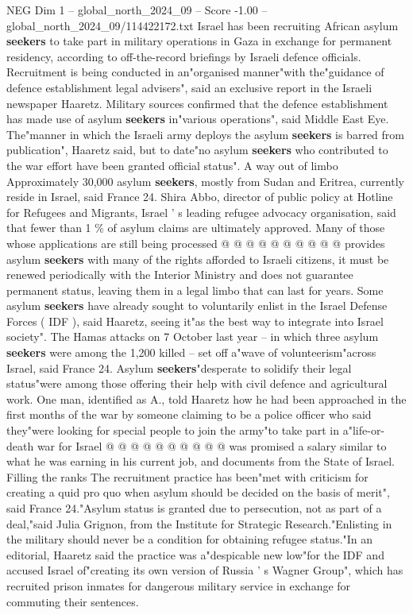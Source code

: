 \begin{textsample}{NEG Dim 1 – global\_north\_2024\_09 – Score -1.00 – global\_north\_2024\_09/114422172.txt}  \label{ex:f1_neg_359}
Israel has been recruiting African asylum \textbf{seekers} to take part in military operations in Gaza in exchange for permanent residency, according to off-the-record briefings by Israeli defence officials.
Recruitment is being conducted in an"organised manner"with the"guidance of defence establishment legal advisers", said an exclusive report in the Israeli newspaper Haaretz.
Military sources confirmed that the defence establishment has made use of asylum \textbf{seekers} in"various operations", said Middle East Eye.
The"manner in which the Israeli army deploys the asylum \textbf{seekers} is barred from publication", Haaretz said, but to date"no asylum \textbf{seekers} who contributed to the war effort have been granted official status".
A way out of limbo Approximately 30,000 asylum \textbf{seekers}, mostly from Sudan and Eritrea, currently reside in Israel, said France 24.
Shira Abbo, director of public policy at Hotline for Refugees and Migrants, Israel ' s leading refugee advocacy organisation, said that fewer than 1 \% of asylum claims are ultimately approved.
Many of those whose applications are still being processed @ @ @ @ @ @ @ @ @ @ provides asylum \textbf{seekers} with many of the rights afforded to Israeli citizens, it must be renewed periodically with the Interior Ministry and does not guarantee permanent status, leaving them in a legal limbo that can last for years.
Some asylum \textbf{seekers} have already sought to voluntarily enlist in the Israel Defense Forces ( IDF ), said Haaretz, seeing it"as the best way to integrate into Israel society".
The Hamas attacks on 7 October last year -- in which three asylum \textbf{seekers} were among the 1,200 killed -- set off a"wave of volunteerism"across Israel, said France 24.
Asylum \textbf{seekers}"desperate to solidify their legal status"were among those offering their help with civil defence and agricultural work.
One man, identified as A., told Haaretz how he had been approached in the first months of the war by someone claiming to be a police officer who said they"were looking for special people to join the army"to take part in a"life-or-death war for Israel @ @ @ @ @ @ @ @ @ @ was promised a salary similar to what he was earning in his current job, and documents from the State of Israel.
Filling the ranks The recruitment practice has been"met with criticism for creating a quid pro quo when asylum should be decided on the basis of merit", said France 24."Asylum status is granted due to persecution, not as part of a deal,"said Julia Grignon, from the Institute for Strategic Research."Enlisting in the military should never be a condition for obtaining refugee status."In an editorial, Haaretz said the practice was a"despicable new low"for the IDF and accused Israel of"creating its own version of Russia ' s Wagner Group", which has recruited prison inmates for dangerous military service in exchange for commuting their sentences.

\end{textsample}

